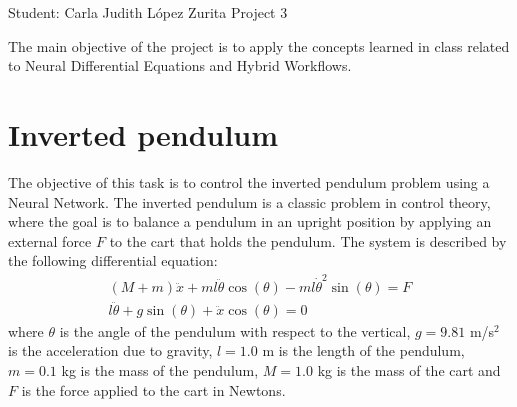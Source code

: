\documentclass[unicode,11pt,a4paper,oneside,numbers=endperiod,openany]{scrartcl}
\begin{document}
\setassignment
{}

            {Student: Carla Judith L\'opez Zurita}
            {}{Project 3}{}
\newline

The main objective of the project is to apply the concepts learned in class
related to Neural Differential Equations and Hybrid Workflows.


\section{Inverted pendulum}\label{sec:task1}
The objective of this task is to control the inverted pendulum problem using a
Neural Network. The inverted pendulum is a classic problem in control theory,
where the goal is to balance a pendulum in an upright position by applying an 
external force $F$ to the cart that holds the pendulum. 
The system is described by the following differential equation:
\begin{align}
    (M+m) \ddot{x} + m l \ddot{\theta} \cos(\theta) - m l \dot{\theta}^2 \sin(\theta) = F \\
    l \ddot{\theta} + g \sin(\theta) + \ddot{x} \cos(\theta) = 0
\end{align}
where $\theta$ is the angle of the pendulum with respect to the vertical,
$g=9.81$ m/s$^2$ is the acceleration due to gravity, $l=1.0$ m is the length of
the pendulum, $m=0.1$ kg is the mass of the pendulum, $M=1.0$ kg is the mass of
the cart and $F$ is the force applied to the cart in Newtons.
\end{document}
